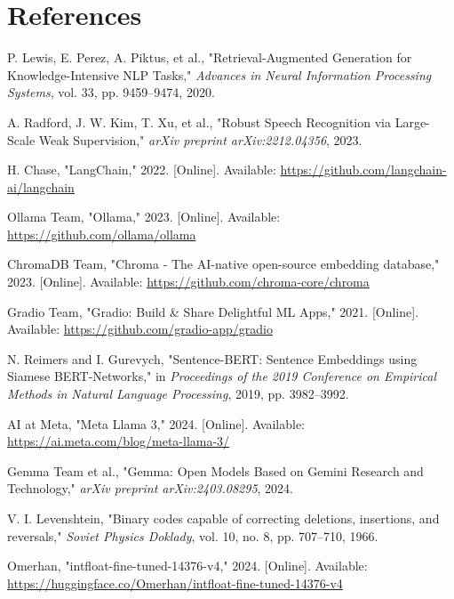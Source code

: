 \chapter*{References}

\begin{thebibliography}{99}

P. Lewis, E. Perez, A. Piktus, et al., "Retrieval-Augmented Generation for Knowledge-Intensive NLP Tasks," \textit{Advances in Neural Information Processing Systems}, vol. 33, pp. 9459--9474, 2020.

A. Radford, J. W. Kim, T. Xu, et al., "Robust Speech Recognition via Large-Scale Weak Supervision," \textit{arXiv preprint arXiv:2212.04356}, 2023.

H. Chase, "LangChain," 2022. [Online]. Available: \url{https://github.com/langchain-ai/langchain}

Ollama Team, "Ollama," 2023. [Online]. Available: \url{https://github.com/ollama/ollama}

ChromaDB Team, "Chroma - The AI-native open-source embedding database," 2023. [Online]. Available: \url{https://github.com/chroma-core/chroma}

Gradio Team, "Gradio: Build \& Share Delightful ML Apps," 2021. [Online]. Available: \url{https://github.com/gradio-app/gradio}

N. Reimers and I. Gurevych, "Sentence-BERT: Sentence Embeddings using Siamese BERT-Networks," in \textit{Proceedings of the 2019 Conference on Empirical Methods in Natural Language Processing}, 2019, pp. 3982--3992.

AI at Meta, "Meta Llama 3," 2024. [Online]. Available: \url{https://ai.meta.com/blog/meta-llama-3/}

Gemma Team et al., "Gemma: Open Models Based on Gemini Research and Technology," \textit{arXiv preprint arXiv:2403.08295}, 2024.

V. I. Levenshtein, "Binary codes capable of correcting deletions, insertions, and reversals," \textit{Soviet Physics Doklady}, vol. 10, no. 8, pp. 707--710, 1966.

Omerhan, "intfloat-fine-tuned-14376-v4," 2024. [Online]. Available: \url{https://huggingface.co/Omerhan/intfloat-fine-tuned-14376-v4}


\end{thebibliography}
